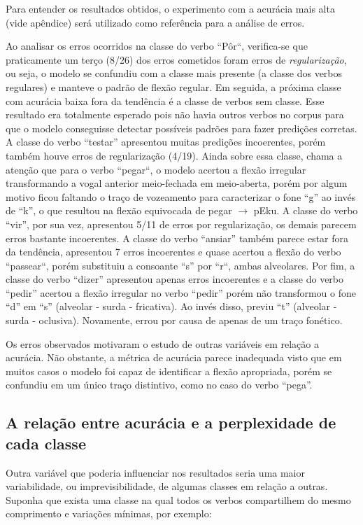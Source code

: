 Para entender os resultados obtidos, o experimento com a acurácia mais alta (vide apêndice) será utilizado como referência para a análise de erros.

Ao analisar os erros ocorridos na classe do verbo “Pôr“, verifica-se que praticamente um terço (8/26) dos erros cometidos foram erros de \textit{regularização}, ou seja, o modelo se confundiu com a classe mais presente (a classe dos verbos regulares) e manteve o padrão de flexão regular. Em seguida, a próxima classe com acurácia baixa fora da tendência é a classe de verbos sem classe. Esse resultado era totalmente esperado pois não havia outros verbos no corpus para que o modelo conseguisse detectar possíveis padrões para fazer predições corretas. A classe do verbo “testar” apresentou muitas predições incoerentes, porém também houve erros de regularização (4/19). Ainda sobre essa classe, chama a atenção que para o verbo “pegar“, o modelo acertou a flexão irregular transformando a vogal anterior meio-fechada em meio-aberta, porém por algum motivo ficou faltando o traço de vozeamento para caracterizar o fone “g” ao invés de “k”, o que resultou na flexão equivocada de pegar $\rightarrow$ pEku. A classe do verbo “vir”, por sua vez, apresentou 5/11 de erros por regularização, os demais parecem erros bastante incoerentes. A classe do verbo “ansiar” também parece estar fora da tendência, apresentou 7 erros incoerentes e quase acertou a flexão do verbo “passear“, porém substituiu a consoante “s” por “r“, ambas alveolares. Por fim, a classe do verbo “dizer” apresentou apenas erros incoerentes e a classe do verbo “pedir” acertou a flexão irregular no verbo “pedir” porém não transformou o fone “d” em “s” (alveolar - surda - fricativa). Ao invés disso, previu “t” (alveolar - surda - oclusiva). Novamente, errou por causa de apenas de um traço fonético.

Os erros observados motivaram o estudo de outras variáveis em relação a acurácia. Não obstante, a métrica de acurácia parece inadequada visto que em muitos casos o modelo foi capaz de identificar a flexão apropriada, porém se confundiu em um único traço distintivo, como no caso do verbo “pega”.



\subsection{A relação entre acurácia e a perplexidade de cada classe}

Outra variável que poderia influenciar nos resultados seria uma maior variabilidade, ou imprevisibilidade, de algumas classes em relação a outras. Suponha que exista uma classe na qual todos os verbos compartilhem do mesmo comprimento e variações mínimas, por exemplo:


